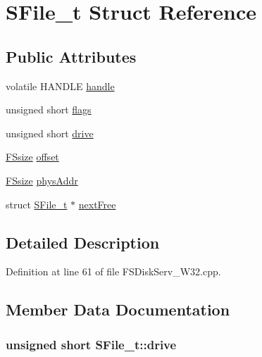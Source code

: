 \hypertarget{struct_s_file__t}{
\section{SFile\_\-t Struct Reference}
\label{struct_s_file__t}
}
\subsection*{Public Attributes}
\begin{CompactItemize}
\item 
volatile HANDLE \hyperlink{struct_s_file__t_9c5b15b8c07aca9928c6a347e765d60f}{handle}
\item 
unsigned short \hyperlink{struct_s_file__t_4dafbf10076baf07fe478e79a33fdc8b}{flags}
\item 
unsigned short \hyperlink{struct_s_file__t_21b0d1399a43df9577404c7b2004c5b4}{drive}
\item 
\hyperlink{filesystem__afx_8h_2dfedf2033eee861d23c808f79ed5837}{FSsize} \hyperlink{struct_s_file__t_3ec63209feb76e69e0d6be30d3cae074}{offset}
\item 
\hyperlink{filesystem__afx_8h_2dfedf2033eee861d23c808f79ed5837}{FSsize} \hyperlink{struct_s_file__t_28381f30fa5e5f18fd8c6e6d7f2a76f3}{physAddr}
\item 
struct \hyperlink{struct_s_file__t}{SFile\_\-t} $\ast$ \hyperlink{struct_s_file__t_efe9a20ae13e8a4b3d92770f7f042493}{nextFree}
\end{CompactItemize}


\subsection{Detailed Description}


Definition at line 61 of file FSDiskServ\_\-W32.cpp.

\subsection{Member Data Documentation}
\hypertarget{struct_s_file__t_21b0d1399a43df9577404c7b2004c5b4}{
\subsubsection[{drive}]{\setlength{\rightskip}{0pt plus 5cm}unsigned short {\bf SFile\_\-t::drive}}}
\label{struct_s_file__t_21b0d1399a43df9577404c7b2004c5b4}




